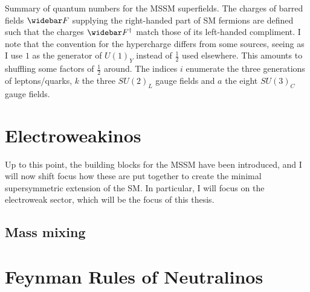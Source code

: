 \documentclass[../main.tex]{subfiles}
\begin{document}
\begin{table}[ht!]
  \caption{Summary of quantum numbers for the MSSM superfields.
    The charges of barred fields \(\wbar{F}\) supplying the right-handed part of SM fermions are defined such that the charges \(\wbar{F}^\dagger\) match those of its left-handed compliment.
    I note that the convention for the hypercharge differs from some sources, seeing as I use \(1\) as the generator of \(U(1)_Y\) instead of \(\frac{1}{2}\) used elsewhere.
    This amounts to shuffling some factors of \(\frac{1}{2}\) around.
    The indices \(i\) enumerate the three generations of leptons/quarks, \(k\) the three \(SU(2)_L\) gauge fields and \(a\) the eight \(SU(3)_C\) gauge fields.}
  \label{susy:tab:mssm_quantum_numbers}
\end{table}




\section{Electroweakinos}

Up to this point, the building blocks for the MSSM have been introduced, and I will now shift focus how these are put together to create the minimal supersymmetric extension of the SM.
In particular, I will focus on the electroweak sector, which will be the focus of this thesis.

\subsection{Mass mixing}





\section{Feynman Rules of Neutralinos}
\end{document}
